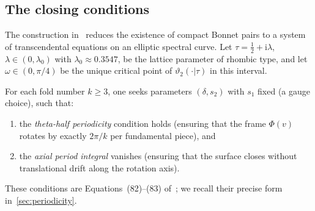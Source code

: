 \documentclass[11pt,a4paper]{article}
\theoremstyle{plain}
\theoremstyle{definition}
\theoremstyle{remark}
\newcommand{\vt}[1]{\vartheta_{#1}}     %
\newcommand{\ii}{\mathrm{i}}
\begin{document}
\subsection{The closing conditions}
The construction in~\cite{BHS25} reduces the existence of compact
Bonnet pairs to a system of transcendental equations on an elliptic
spectral curve.  Let $\tau = \tfrac{1}{2} + \ii\lambda$,
$\lambda \in (0,\lambda_0)$ with $\lambda_0 \approx 0.3547$, be the
lattice parameter of rhombic type, and let $\omega \in (0,\pi/4)$ be
the unique critical point of $\vt{2}(\cdot|\tau)$ in this interval.

For each fold number $k \geq 3$, one seeks parameters $(\delta, s_2)$
with $s_1$ fixed (a gauge choice), such that:
\begin{enumerate}[label=(\roman*),nosep]
\item the \emph{theta-half periodicity} condition holds
  (ensuring that the frame $\Phi(v)$ rotates by exactly $2\pi/k$ per
  fundamental piece), and
\item the \emph{axial period integral} vanishes
  (ensuring that the surface closes without translational drift
  along the rotation axis).
\end{enumerate}
These conditions are Equations~(82)--(83) of~\cite{BHS25}; we
recall their precise form in~\cref{sec:periodicity}.
\end{document}
